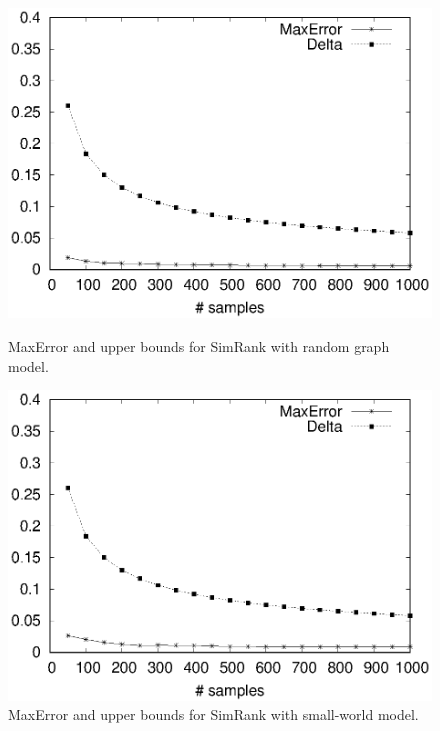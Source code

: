 \documentclass{article}
\begin{document}
\begin{figure}[!t]
\centering
\begin{minipage}{.45\textwidth}
\centering
\includegraphics[width=.9\textwidth]{simrank_rg_apprx_error.eps}
\caption{\textsf{MaxError} and upper bounds for SimRank with random graph model.}
\label{fig:rgae}
\end{minipage}
\hspace{1cm}
\begin{minipage}{.45\textwidth}
\centering
\includegraphics[width=.9\textwidth]{simrank_sw_apprx_error.eps}
\caption{\textsf{MaxError} and upper bounds for SimRank with small-world model.}
\label{fig:swae}
\end{minipage}
\end{figure}
\end{document}
